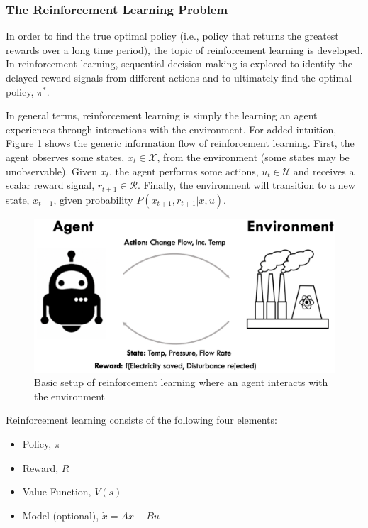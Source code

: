 \subsubsection{The Reinforcement Learning Problem}

In order to find the true optimal policy (i.e., policy that returns the greatest rewards over a long time period), the topic of reinforcement learning is developed.  In reinforcement learning, sequential decision making is explored to identify the delayed reward signals from different actions and to ultimately find the optimal policy, $\pi^*$.  

In general terms, reinforcement learning is simply the learning an agent experiences through interactions with the environment.  For added intuition, Figure \ref{fig: simple_rl} shows the generic information flow of reinforcement learning. First, the agent observes some states, $x_t \in \mathcal{X}$, from the environment (some states may be unobservable).  Given $x_t$, the agent performs some actions, $u_t \in \mathcal{U}$ and receives a scalar reward signal, $r_{t+1} \in \mathcal{R}$.  Finally, the environment will transition to a new state, $x_{t+1}$, given probability $P(x_{t+1}, r_{t+1} | x, u)$.

\begin{figure}[h]
    \centering
    \includegraphics[scale=0.5]{images/RL.png}
    \caption{Basic setup of reinforcement learning where an agent interacts with the environment}
    \label{fig: simple_rl}

\end{figure}

Reinforcement learning consists of the following four elements:

\begin{itemize}
    \item Policy, $\pi$
    \item Reward, $R$
    \item Value Function, $V(s)$
    \item Model (optional), $\dot{x} = Ax + Bu$
\end{itemize}


